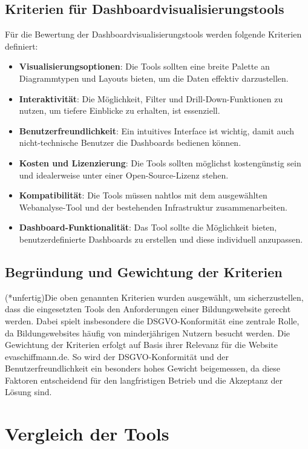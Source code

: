 \subsection{Kriterien für Dashboardvisualisierungstools}
Für die Bewertung der Dashboardvisualisierungstools werden folgende Kriterien definiert:
\begin{itemize}
    \item \textbf{Visualisierungsoptionen}: Die Tools sollten eine breite Palette an Diagrammtypen und Layouts bieten, um die Daten effektiv darzustellen.
    \item \textbf{Interaktivität}: Die Möglichkeit, Filter und Drill-Down-Funktionen zu nutzen, um tiefere Einblicke zu erhalten, ist essenziell.
    \item \textbf{Benutzerfreundlichkeit}: Ein intuitives Interface ist wichtig, damit auch nicht-technische Benutzer die Dashboards bedienen können.
    \item \textbf{Kosten und Lizenzierung}: Die Tools sollten möglichst kostengünstig sein und idealerweise unter einer Open-Source-Lizenz stehen.
    \item \textbf{Kompatibilität}: Die Tools müssen nahtlos mit dem ausgewählten Webanalyse-Tool und der bestehenden Infrastruktur zusammenarbeiten.
    \item \textbf{Dashboard-Funktionalität}: Das Tool sollte die Möglichkeit bieten, benutzerdefinierte Dashboards zu erstellen und diese individuell anzupassen.
\end{itemize}

\subsection{Begründung und Gewichtung der Kriterien}
(*unfertig)Die oben genannten Kriterien wurden ausgewählt, um sicherzustellen, dass die eingesetzten Tools den Anforderungen einer Bildungswebsite gerecht werden. Dabei spielt insbesondere die DSGVO-Konformität eine zentrale Rolle, da Bildungswebsites häufig von minderjährigen Nutzern besucht werden. Die Gewichtung der Kriterien erfolgt auf Basis ihrer Relevanz für die Website evaschiffmann.de. So wird der DSGVO-Konformität und der Benutzerfreundlichkeit ein besonders hohes Gewicht beigemessen, da diese Faktoren entscheidend für den langfristigen Betrieb und die Akzeptanz der Lösung sind.

\section{Vergleich der Tools}

